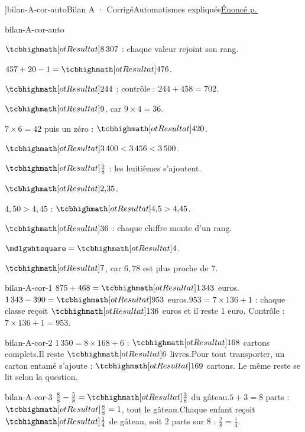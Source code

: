 \editionPage[\pdfbookmark[0]{Corrigés des bilans}{bm-bilan-A-cor-auto-parent}]{bilan-A-cor-auto}{Bilan A · Corrigé}{Automatismes expliqués}{\hyperref[bilan-A-auto]{Énoncé p.\,\pageref*{bilan-A-auto}}}
\begin{blocEdition}{bilan-A-cor-auto}
\begin{questions}
\item $\res{8\,307}$ : chaque valeur rejoint son rang.
\item $457+20-1=\res{476}$.
\item $\res{244}$ ; contrôle : $244+458=702$.
\item $\res9$, car $9\times4=36$.
\item $7\times6=42$ puis un zéro : $\res{420}$.
\item $\res{3\,400<3\,456<3\,500}$.
\item $\res{\frac58}$ : les huitièmes s’ajoutent.
\item $\res{2{,}35}$.
\item $4{,}50>4{,}45$ : $\res{4{,}5>4{,}45}$.
\item $\res{36}$ : chaque chiffre monte d’un rang.
\item $\square=\res4$.
\item $\res7$, car $6{,}78$ est plus proche de 7.\end{questions}
\end{blocEdition}
\begin{blocEdition}{bilan-A-cor-1}
$875+468=\res{1\,343}$ euros.$1\,343-390=\res{953}$ euros.$953=7\times136+1$ : chaque classe reçoit $\res{136}$ euros et il reste 1 euro. Contrôle : $7\times136+1=953$.
\end{blocEdition}
\begin{blocEdition}{bilan-A-cor-2}
$1\,350=8\times168+6$ : $\res{168}$ cartons complets.Il reste $\res6$ livres.Pour tout transporter, un carton entamé s’ajoute : $\res{169}$ cartons. Le même reste se lit selon la question.
\end{blocEdition}
\begin{blocEdition}{bilan-A-cor-3}
$\frac88-\frac58=\res{\frac38}$ du gâteau.$5+3=8$ parts : $\res{\frac88=1}$, tout le gâteau.Chaque enfant reçoit $\res{\frac14}$ de gâteau, soit 2 parts sur 8 : $\frac28=\frac14$.
\end{blocEdition}
